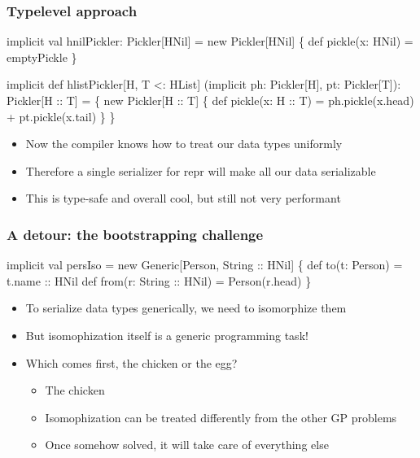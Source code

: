 \documentclass[svgnames,hyperref={bookmarks=false}]{beamer}
\begin{document}
\begin{frame}[fragile]
\frametitle{Typelevel approach}

\begin{semiverbatim}
implicit val hnilPickler: Pickler[HNil] =
  new Pickler[HNil] \{ def pickle(x: HNil) = emptyPickle \}

implicit def hlistPickler[H, T <: HList]
  (implicit ph: Pickler[H],
            pt: Pickler[T]): Pickler[H :: T] = \{
  new Pickler[H :: T] \{
    def pickle(x: H :: T) =
      ph.pickle(x.head) + pt.pickle(x.tail)
  \}
\}

\end{semiverbatim}

\begin{itemize}
\item Now the compiler knows how to treat our data types uniformly
\item Therefore a single serializer for repr will make all our data serializable
\item This is type-safe and overall cool, but still not very performant
\end{itemize}
\end{frame}

\begin{frame}[fragile]
\frametitle{A detour: the bootstrapping challenge}

\begin{semiverbatim}
implicit val persIso = new Generic[Person, String :: HNil] \{
  def to(t: Person) = t.name :: HNil
  def from(r: String :: HNil) = Person(r.head)
\}

\end{semiverbatim}

\begin{itemize}
\item To serialize data types generically, we need to isomorphize them
\item But isomophization itself is a generic programming task!
\item Which comes first, the chicken or the egg?
\pause
\begin{itemize}
\item The chicken
\item Isomophization can be treated differently from the other GP problems
\item Once somehow solved, it will take care of everything else
\end{itemize}
\end{itemize}
\end{frame}
\end{document}
